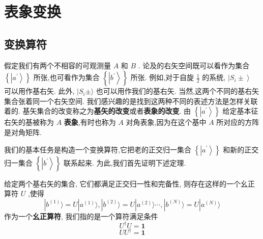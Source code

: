 \documentclass[lang=cn,newtx,10pt,scheme=chinese,thmcnt=section]{elegantbook}
\begin{document}
\section{表象变换}
\subsection*{变换算符}
假定我们有两个不相容的可观测量 $A$ 和 $B$ . 论及的右矢空间既可以看作为集合 $\left\{ \left| {a}^{\prime }\right\rangle \right\}$ 所张,也可看作为集合 $\left\{ \left| {b}^{\prime }\right\rangle \right\}$ 所张. 例如,对于自旋 $\frac{1}{2}$ 的系统, $\left| {{S}_{i} \pm }\right\rangle$ 可以用作基右矢. 此外, $| {S}_{i} \pm \rangle$ 也可以用作我们的基右矢. 当然,这两个不同的基右矢集合张着同一个右矢空间. 我们感兴趣的是找到这两种不同的表述方法是怎样关联着的. 基矢集合的改变称之为\textbf{基矢的改变}或者\textbf{表象的改变}. 由 $\left\{ \left| {a}^{\prime }\right\rangle \right\}$ 给定基本征右矢的基被称为 $A$ \textbf{表象},有时也称为 $A$ 对角表象,因为在这个基中 $A$ 所对应的方阵是对角矩阵.

我们的基本任务是构造一个变换算符,它把老的正交归一集合 $\left\{ \left| {a}^{\prime }\right\rangle \right\}$ 和新的正交归一集合 $\left\{ \left| {b}^{\prime }\right\rangle \right\}$ 联系起来. 为此,我们首先证明下述定理.

\begin{theorem}\label{thm:1.3}
	 给定两个基右矢的集合, 它们都满足正交归一性和完备性, 则存在这样的一个幺正算符 $U$ ,使得
	 \begin{equation}
	 	| {b}^{( 1) }\rangle = U| {a}^{( 1) }\rangle ,| {b}^{( 2) }\rangle = U| {a}^{( 2) }\rangle \cdots ,| {b}^{( N) }\rangle = U| {a}^{( N) }\rangle
	 \end{equation}
	 作为一个\textbf{幺正算符}, 我们指的是一个算符满足条件
	 \begin{equation}
	 	{U}^{ \dagger }U = \textbf{1}
	 \end{equation}
	 \begin{equation}
	 	U{U}^{ \dagger } = \textbf{1}
	 \end{equation}
\end{theorem}
\end{document}

